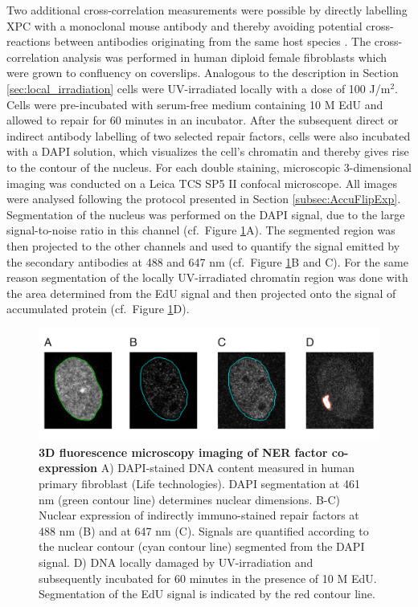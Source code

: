 Two additional cross-correlation measurements were possible by directly labelling XPC with a monoclonal mouse antibody and thereby avoiding potential cross-reactions between antibodies originating from the same host species \cite{Burry2011,Giepmans2006}. The cross-correlation analysis was performed in human diploid female fibroblasts which were grown to confluency on coverslips. Analogous to the description in Section \ref{sec:local_irradiation} cells were UV-irradiated locally with a dose of 100 J/$\text{m}^\text{2}$. Cells were pre-incubated with serum-free medium containing 10 \textmu M EdU and allowed to repair for 60 minutes in an incubator. After the subsequent direct or indirect antibody labelling of two selected repair factors, cells were also incubated with a DAPI solution, which visualizes the cell's chromatin and thereby gives rise to the contour of the nucleus. For each double staining, microscopic 3-dimensional imaging was conducted on a Leica TCS SP5 II confocal microscope. All images were analysed following the protocol presented in Section \ref{subsec:AccuFlipExp}. Segmentation of the nucleus was performed on the DAPI signal, due to the large signal-to-noise ratio in this channel (cf.\ Figure \ref{fig:coStaining}A). The segmented region was then projected to the other channels and used to quantify the signal emitted by the secondary antibodies at 488 and 647 nm (cf.\ Figure \ref{fig:coStaining}B and C). For the same reason segmentation of the locally UV-irradiated chromatin region was done with the area determined from the EdU signal and then projected onto the signal of accumulated protein (cf.\ Figure \ref{fig:coStaining}D).   

\begin{figure}[t!]
	\begin{center}
		\includegraphics[width=1\textwidth]{Abbildungen/figure4_1.pdf}
		\caption{\textbf{3D fluorescence microscopy imaging of NER factor co-expression} A) DAPI-stained DNA content measured in human primary fibroblast (Life technologies). DAPI segmentation at 461 nm  (green contour line) determines nuclear dimensions. B-C) Nuclear expression of indirectly immuno-stained repair factors at 488 nm (B) and at 647 nm (C). Signals are quantified according to the nuclear contour (cyan contour line) segmented from the DAPI signal. D) DNA locally damaged by UV-irradiation and subsequently incubated for 60 minutes in the presence of 10 \textmu M EdU. Segmentation of the EdU signal is indicated by the red contour line.   }
		\label{fig:coStaining}
	\end{center}
\end{figure}

